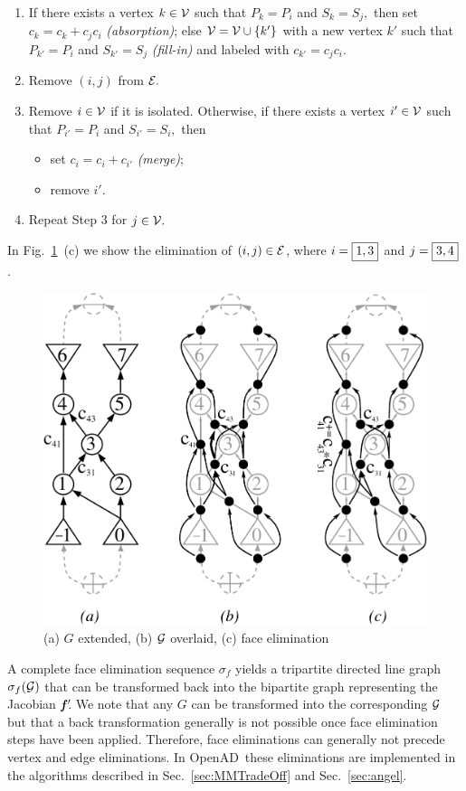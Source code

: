 \documentclass{book}
\newcommand{\OpenAD}{OpenAD}
\newcommand{\bmfp}{\mbox{\bf\em f$\,^\prime\!\!$}}
\newcommand{\refsec}[1]{{Sec.~\ref{#1}}}
\newcommand{\reffig}[1]{{Fig.~\ref{#1}}}
\begin{document}
\begin{enumerate}
\item If there exists a vertex $k \in \cal V$ such that $P_k = P_i$ and
  $S_k = S_j,$ then
  set $c_k = c_k + c_j c_i$ {\em (absorption)};
  else ${\cal V}={\cal V} \cup \{k'\}$ with a new vertex $k'$ such that
  $P_{k'} = P_i$ and $S_{k'} = S_j$
  {\em (fill-in)} and labeled with $c_{k'} = c_j c_i.$
\item Remove $(i,j)$ from $\cal E.$
\item Remove $i \in \cal V$ if it is isolated. Otherwise, if there exists a vertex $i' \in \cal V$ such that
  $P_{i'} = P_i$ and $S_{i'} = S_i,$ then
  \begin{itemize}
  \item set $c_i=c_i + c_{i'}$ {\em (merge)};
  \item remove $i'.$
  \end{itemize}
\item Repeat Step 3 for $j \in \cal V.$
\end{enumerate}
In \reffig{fig:face_elims}~(c) we show the elimination of $(i,j) \in \cal E$,
where $i=\framebox{$1,3$}$ and $j=\framebox{$3,4$}$.

\begin{figure}
  \centering\includegraphics[width=.65\textwidth]{face_elims}
  \caption{
    (a) $G$ extended, 
    (b) $\cal G$ overlaid, 
    (c) face elimination 
  }
  \label{fig:face_elims}
\end{figure}
A complete face elimination sequence $\sigma_f$ yields a tripartite 
directed line graph $\sigma_f({\cal G})$ that can be transformed back into 
the bipartite graph representing the Jacobian $\bmfp$.
We note that any $G$ can be transformed into the 
corresponding $\cal G$ but that a back transformation 
generally is not  possible once face elimination steps have been applied. 
Therefore, face eliminations can generally not precede vertex and edge 
eliminations.
In \OpenAD\ these eliminations are implemented in the algorithms described in 
\refsec{sec:MMTradeOff} and \refsec{sec:angel}.
\end{document}
